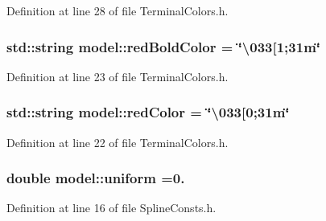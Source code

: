 Definition at line 28 of file Terminal\+Colors.\+h.

\hypertarget{namespacemodel_a1f95d0545b18bbe40e02a8e2dbb83899}{}
\subsubsection[{red\+Bold\+Color}]{\setlength{\rightskip}{0pt plus 5cm}std\+::string model\+::red\+Bold\+Color = \char`\"{}\textbackslash{}033\mbox{[}1;31m\char`\"{}}\label{namespacemodel_a1f95d0545b18bbe40e02a8e2dbb83899}


Definition at line 23 of file Terminal\+Colors.\+h.

\hypertarget{namespacemodel_a0b43b229c333feec93e0cdbdbed82373}{}
\subsubsection[{red\+Color}]{\setlength{\rightskip}{0pt plus 5cm}std\+::string model\+::red\+Color = \char`\"{}\textbackslash{}033\mbox{[}0;31m\char`\"{}}\label{namespacemodel_a0b43b229c333feec93e0cdbdbed82373}


Definition at line 22 of file Terminal\+Colors.\+h.

\hypertarget{namespacemodel_adf356cd2629d2de9a5a14ceace67cd94}{}
\subsubsection[{uniform}]{\setlength{\rightskip}{0pt plus 5cm}double model\+::uniform =0.}\label{namespacemodel_adf356cd2629d2de9a5a14ceace67cd94}


Definition at line 16 of file Spline\+Consts.\+h.

